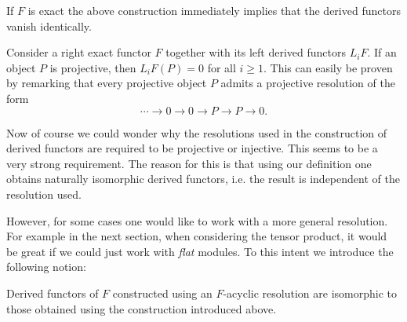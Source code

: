 	\begin{property}
		If $F$ is exact the above construction immediately implies that the derived functors vanish identically.
	\end{property}

	\begin{property}\label{homalg:projective_object}
		Consider a right exact functor $F$ together with its left derived functors $L_iF$. If an object $P$ is projective, then $L_iF(P)=0$ for all $i\geq1$. This can easily be proven by remarking that every projective object $P$ admits a projective resolution of the form \[\cdots\longrightarrow0\longrightarrow0\longrightarrow P\longrightarrow P\longrightarrow0.\]
	\end{property}

	Now of course we could wonder why the resolutions used in the construction of derived functors are required to be projective or injective. This seems to be a very strong requirement. The reason for this is that using our definition one obtains naturally isomorphic derived functors, i.e. the result is independent of the resolution used.

	However, for some cases one would like to work with a more general resolution. For example in the next section, when considering the tensor product, it would be great if we could just work with \textit{flat} modules. To this intent we introduce the following notion:
    \begin{property}\label{homalg:acyclic_derived_functors}
        Derived functors of $F$ constructed using an $F$-acyclic resolution are isomorphic to those obtained using the construction introduced above.
    \end{property}

